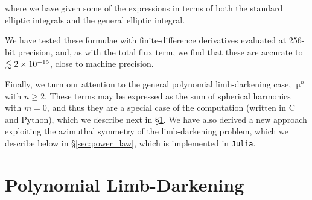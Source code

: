 \documentclass[modern]{aastex61}
\begin{document}
where we have given some of the expressions in terms of both the standard elliptic integrals
and the general elliptic integral.

We have tested these formulae with finite-difference derivatives evaluated at
256-bit precision, and, as with the total flux term, we find that these are accurate 
to $\lesssim 2 \times 10^{-15}$, close to machine precision.

Finally, we turn our attention to the general polynomial limb-darkening case,
$\upmu^n$ with $n \ge 2$.  These terms may be expressed as the sum of
spherical harmonics with $m=0$, and thus they are a special case of the \starry 
computation (written in C and Python), which we describe next in \S \ref{sec:quad}.  
We have also derived a new approach exploiting the azimuthal symmetry of the 
limb-darkening problem, which we describe below in \S \ref{sec:power_law}, 
which is implemented in \texttt{Julia}.


%
\clearpage
\section{Polynomial Limb-Darkening}
\label{sec:quad}
\end{document}

